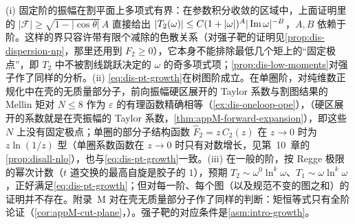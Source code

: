 \begin{remark}[部分子增长条件的地位]\label{rem:dis-pt-growth}
(i) 固定阶的振幅在割平面上多项式有界：在参数积分收敛的区域中，上面证明里的 $|\mathcal F|\ge\sqrt{1-|\cos\theta|}\,A$ 直接给出 $|T_2(\omega)|\le C(1+|\omega|)^{A}|\operatorname{Im}\omega|^{-B}$，$A,B$ 依赖于阶。这样的界只容许带有限个减除的色散关系（对强子靶的证明见\cref{prop:dis-dispersion-np}，那里还用到 $F_2\ge0$），它本身不能排除最低几个矩上的“固定极点”，即 $T_2$ 中不被割线跳跃决定的 $\omega$ 的奇多项式项；\cref{prop:dis-low-moments}对强子作了同样的分析。(ii) \cref{eq:dis-pt-growth}在树图阶成立。在单圈阶，对纯维数正规化中在壳的无质量部分子，前向振幅硬区展开的 Taylor 系数与割图结果的 Mellin 矩对 $N\le8$ 作为 $\varepsilon$ 的有理函数精确相等（\cref{ex:dis-oneloop-ope}），（硬区展开的系数就是在壳振幅的 Taylor 系数，\cref{thm:appM-forward-expansion}），即这些 $N$ 上没有固定极点；单圈的部分子结构函数 $\hat F_2=z\,C_2(z)$ 在 $z\to0$ 时为 $z\ln(1/z)$ 型（单圈系数函数在 $z\to0$ 时只有对数增长，见第~10~章的\cref{prop:disall-nlo}），也与\cref{eq:dis-pt-growth}一致。(iii) 在一般的阶，按 Regge 极限的幂次计数（$t$ 道交换的最高自旋是胶子的 $1$），预期 $T_2\sim\omega^0\ln^k\omega$、$T_1\sim\omega\ln^k\omega$，正好满足\cref{eq:dis-pt-growth}；但对每一阶、每个图（以及规范不变的图之和）的证明并不存在。附录~M 对在壳无质量部分子作了同样的判断：矩恒等式只有全阶论证（\cref{cor:appM-cut-plane}，\tagA）。强子靶的对应条件是\cref{asm:intro-growth}。
\end{remark}

